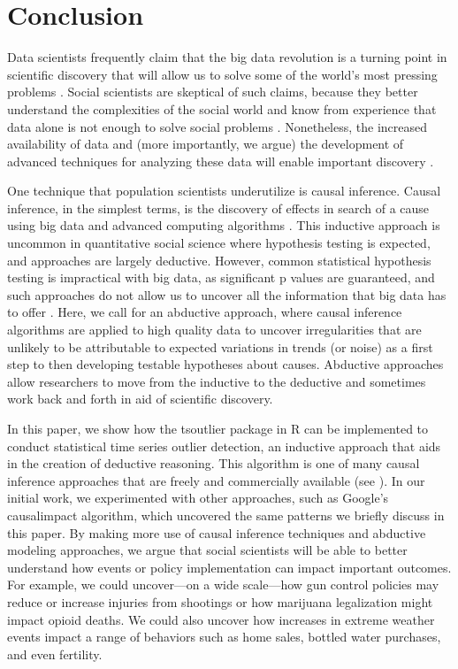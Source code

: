 \documentclass[12pt]{article}
\begin{document}
\hypertarget{conclusion}{%
\section{Conclusion}\label{conclusion}}

Data scientists frequently claim that the big data revolution is a
turning point in scientific discovery that will allow us to solve some
of the world's most pressing problems \citep{grimmer2015ppsp}. Social
scientists are skeptical of such claims, because they better understand
the complexities of the social world and know from experience that data
alone is not enough to solve social problems
\citep{bohon2018demography, grimmer2015ppsp}. Nonetheless, the increased
availability of data and (more importantly, we argue) the development of
advanced techniques for analyzing these data will enable important
discovery \citep{monroe2015no}.

One technique that population scientists underutilize is causal
inference. Causal inference, in the simplest terms, is the discovery of
effects in search of a cause using big data and advanced computing
algorithms \citep{imai2008misunderstandings}. This inductive approach is
uncommon in quantitative social science where hypothesis testing is
expected, and approaches are largely deductive. However, common
statistical hypothesis testing is impractical with big data, as
significant p values are guaranteed, and such approaches do not allow us
to uncover all the information that big data has to offer
\citep{monroe2015no}. Here, we call for an abductive approach, where
causal inference algorithms are applied to high quality data to uncover
irregularities that are unlikely to be attributable to expected
variations in trends (or noise) as a first step to then developing
testable hypotheses about causes. Abductive approaches allow researchers
to move from the inductive to the deductive and sometimes work back and
forth in aid of scientific discovery.

In this paper, we show how the tsoutlier package in R can be implemented
to conduct statistical time series outlier detection, an inductive
approach that aids in the creation of deductive reasoning. This
algorithm is one of many causal inference approaches that are freely and
commercially available (see \citet{rcausalimpact}). In our initial work,
we experimented with other approaches, such as Google's causalimpact
algorithm, which uncovered the same patterns we briefly discuss in this
paper. By making more use of causal inference techniques and abductive
modeling approaches, we argue that social scientists will be able to
better understand how events or policy implementation can impact
important outcomes. For example, we could uncover---on a wide
scale---how gun control policies may reduce or increase injuries from
shootings or how marijuana legalization might impact opioid deaths. We
could also uncover how increases in extreme weather events impact a
range of behaviors such as home sales, bottled water purchases, and even
fertility.
\end{document}
